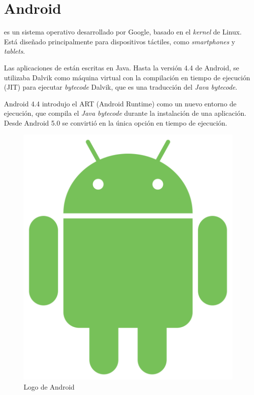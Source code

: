 
\section{Android}

\label{Android}

 es un sistema operativo desarrollado por Google, basado en el \emph{kernel} de Linux.
Está diseñado principalmente para dispositivos táctiles, como \emph{smartphones} y \emph{tablets}.

Las aplicaciones de  están escritas en Java.
Hasta la versión 4.4 de Android, se utilizaba Dalvik como máquina virtual con la compilación
en tiempo de ejecución (JIT) para ejecutar \emph{bytecode} Dalvik, que es una traducción del
\emph{Java bytecode}.

Android 4.4 introdujo el ART (Android Runtime) como un nuevo entorno de ejecución, que
compila el \emph{Java bytecode} durante la instalación de una aplicación. Desde Android
5.0 se convirtió en la única opción en tiempo de ejecución. \emph{\parencite{Reference7}}

\begin{figure}[ht]
  \centering
  \includegraphics[scale=0.1]{Figures/AndroidLogo}
  \decoRule
  \caption[Android (Logo)]{Logo de Android \emph{\parencite{Reference3}}}
  \label{fig:AndroidLogo}
\end{figure}

